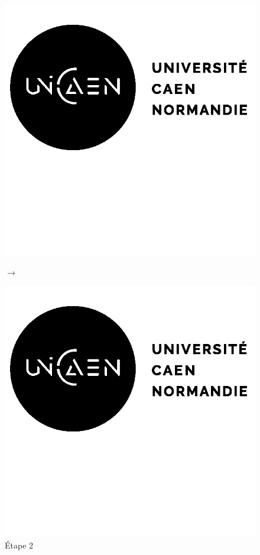 \documentclass[12pt, a4paper]{article}
\begin{document}
\begin{center}
\begin{figure}[!h]
\begin{minipage}{.3\linewidth}
                    \includegraphics[scale=0.2]{img/logo.png}
                    \caption{Étape 2}
                \end{minipage}
                $\rightarrow$
                \begin{minipage}{.3\linewidth}
                    \centering
                    \includegraphics[scale=0.2]{img/logo.png}

\end{minipage}
\end{figure}
\end{center}
\end{document}
